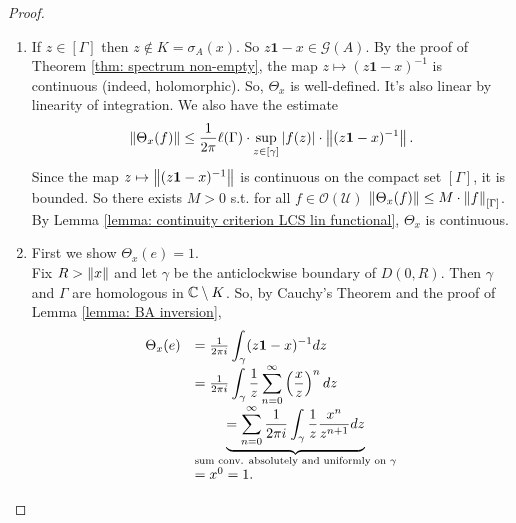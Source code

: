 \documentclass{article}
\begin{document}
\begin{proof}

\begin{enumerate}[label = (\roman*), align = left]
    \item If $z\in [\Gamma]$ then $z\not\in K = \sigma_A(x)$. So $z\mathbf{1}-x\in \mathcal{G}(A)$. By the proof of Theorem \ref{thm: spectrum non-empty}, the map $z\mapsto (z\mathbf{1}-x)^{-1}$ is continuous (indeed, holomorphic). So, $\Theta_x$ is well-defined. It's also linear by linearity of integration. We also have the estimate
 $$
 \left\lVert\Theta_x(f)\right\rVert\leq \frac{1}{2\pi}\ell(\Gamma)\cdot\displaystyle\sup_{z\in[\gamma]}|f(z)|\cdot\left\lVert(z\mathbf{1}-x)^{-1}\right\rVert.
 $$
 Since the map $z\mapsto \left\lVert(z\mathbf{1}-x)^{-1}\right\rVert$ is continuous on the compact set $[\Gamma]$, it is bounded. So there exists $M>0$ s.t. for all $f\in \mathcal{O}(\mathcal{U})$ $\left\lVert\Theta_x(f)\right\rVert\leq M\cdot \left\lVert f\right\rVert_{[\Gamma]}$.\\

 By Lemma \ref{lemma: continuity criterion LCS lin functional}, $\Theta_x$ is continuous.
 \item First we show $\Theta_x(e)=1$.\\

 Fix $R>\left\lVert x\right\rVert$ and let $\gamma$ be the anticlockwise boundary of $D(0,R)$. Then $\gamma$ and $\Gamma$ are homologous in $\mathbb{C}\setminus K$. So, by Cauchy's Theorem and the proof of Lemma \ref{lemma: BA inversion}, 
 $$
 \begin{array}{ll}
     \Theta_x(e) &= \frac{1}{2\pi i}\displaystyle\int_{\gamma}(z\mathbf{1}-x)^{-1}dz\\
     &= \frac{1}{2\pi i}\displaystyle\int_{\gamma}\frac{1}{z}\displaystyle\sum^\infty_{n=0}\left(\frac{x}{z}\right)^ndz\\
     &\noindent\underbrace{=\sum^\infty_{n=0}\frac{1}{2\pi i}\displaystyle\int_{\gamma}\frac{1}{z}\frac{x^n}{z^{n+1}} dz}_{\text{sum conv. absolutely and uniformly on } \gamma}\\
     &= x^0 = 1.
 \end{array}
 $$


\end{enumerate}
\end{proof}
\end{document}
